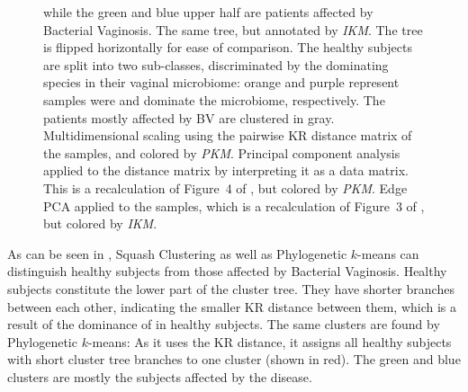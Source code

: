 \begin{figure}[!ht]
{        while the green and blue upper half are patients affected by Bacterial Vaginosis.
        The same tree, but annotated by \emph{IKM}.
        The tree is flipped horizontally for ease of comparison.
        The healthy subjects are split into two sub-classes,
        discriminated by the dominating species in their vaginal microbiome:
        orange and purple represent samples were  and 
        dominate the microbiome, respectively.
        The patients mostly affected by BV are clustered in gray.
        Multidimensional scaling using the pairwise KR distance matrix of the samples,
        and colored by \emph{PKM}.
        Principal component analysis applied to the distance matrix by interpreting it as a data matrix.
        This is a recalculation of Figure~4 of \cite{Matsen2011b},
        but colored by \emph{PKM}.
        Edge PCA applied to the samples,
        which is a recalculation of Figure~3 of \cite{Matsen2011b},
        but colored by \emph{IKM}.
    }
    \label{fig:cluster_kmeans}
\end{figure}

As can be seen in , Squash Clustering as well as
Phylogenetic $k$-means can distinguish healthy subjects from those affected by Bacterial Vaginosis.
Healthy subjects constitute the lower part of the cluster tree.
They have shorter branches between each other, indicating the smaller KR distance between them,
which is a result of the dominance of  in healthy subjects.
The same clusters are found by Phylogenetic $k$-means:
As it uses the KR distance, it assigns all healthy subjects with short cluster tree branches to one cluster (shown in red).
The green and blue clusters are mostly the subjects affected by the disease.

